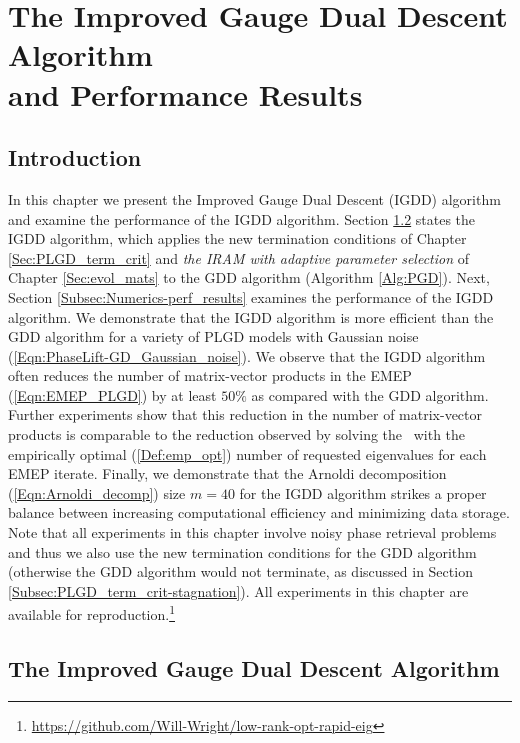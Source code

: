 \chapter{The Improved Gauge Dual Descent Algorithm \\and Performance Results}
\label{Sec:Numerics}


\section{Introduction} 		\label{Subsec:Numerics-intro}

In this chapter we present the Improved Gauge Dual Descent (IGDD) algorithm and examine the performance of the IGDD algorithm.
Section \ref{Subsec:Numerics-improved_PGD} states the IGDD algorithm, which applies the new termination conditions of Chapter \ref{Sec:PLGD_term_crit} and \textit{the IRAM with adaptive parameter selection} of Chapter \ref{Sec:evol_mats} to the GDD algorithm (Algorithm \ref{Alg:PGD}).
Next, Section \ref{Subsec:Numerics-perf_results} examines the performance of the IGDD algorithm.
We demonstrate that the IGDD algorithm is more efficient than the GDD algorithm for a variety of PLGD models with Gaussian noise (\ref{Eqn:PhaseLift-GD_Gaussian_noise}).
We observe that the IGDD algorithm often reduces the number of matrix-vector products in the EMEP (\ref{Eqn:EMEP_PLGD}) by at least $50\%$ as compared with the GDD algorithm.
Further experiments show that this reduction in the number of matrix-vector products is comparable 
to the reduction observed by solving the \emep \ with the empirically optimal (\ref{Def:emp_opt}) number of requested eigenvalues for each EMEP iterate.
Finally, we demonstrate that the Arnoldi decomposition (\ref{Eqn:Arnoldi_decomp}) size $m = 40$ for the IGDD algorithm strikes a proper balance between increasing computational efficiency and minimizing data storage.
Note that all experiments in this chapter involve noisy phase retrieval problems and thus we also use the new termination conditions for the GDD algorithm (otherwise the GDD algorithm would not terminate, as discussed in Section \ref{Subsec:PLGD_term_crit-stagnation}).
All experiments in this chapter are available for reproduction.\footnote{\url{https://github.com/Will-Wright/low-rank-opt-rapid-eig}}






\section{The Improved Gauge Dual Descent Algorithm}	\label{Subsec:Numerics-improved_PGD}


